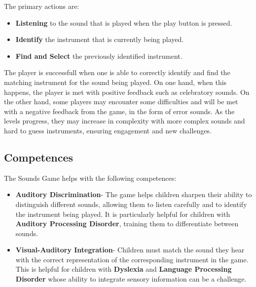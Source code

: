 The primary actions are:

\begin{itemize}
    \item \textbf{Listening} to the sound that is played when the play button is pressed.
    \item \textbf{Identify} the instrument that is currently being played.
    \item \textbf{Find and Select} the previously identified instrument. 
\end{itemize}


The player is successfull when one is able to correctly identify and find the matching instrument for the sound being played. On one hand, when this happens, the player is met with positive feedback such as celebratory sounds. On the other hand, some players may encounter some difficulties and will be met with a negative feedback from the game, in the form of error sounds.
As the levels progress, they may increase in complexity with more complex sounds and hard to guess instruments, ensuring engagement and new challenges.

\subsection*{Competences}
The Sounds Game helps with the following competences:

\begin{itemize}
    \item \textbf{Auditory Discrimination}- The game helps children sharpen their ability to distinguish different sounds, allowing them to listen carefully and to identify the instrument being played. It is particularly helpful for children with \textbf{Auditory Processing Disorder}, training them to differentiate between sounds.

    \item \textbf{Visual-Auditory Integration}- Children must match the sound they hear with the correct representation of the corresponding instrument in the game. This is helpful for children with \textbf{Dyslexia} and \textbf{Language Processing Disorder} whose ability to integrate sensory information can be a challenge.
    
\end{itemize}

